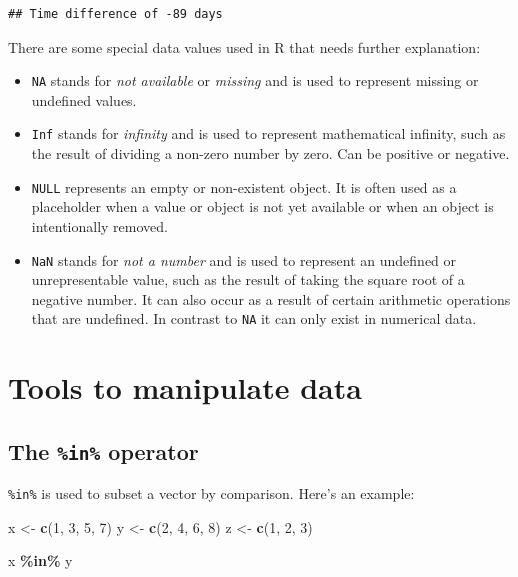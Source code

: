 \documentclass[
  12pt,
  oneside]{book}
\newenvironment{Shaded}{\begin{snugshade}}{\end{snugshade}}
\newcommand{\DecValTok}[1]{\textcolor[rgb]{0.00,0.00,0.81}{#1}}
\newcommand{\FunctionTok}[1]{\textcolor[rgb]{0.13,0.29,0.53}{\textbf{#1}}}
\newcommand{\NormalTok}[1]{#1}
\newcommand{\OtherTok}[1]{\textcolor[rgb]{0.56,0.35,0.01}{#1}}
\newcommand{\SpecialCharTok}[1]{\textcolor[rgb]{0.81,0.36,0.00}{\textbf{#1}}}
\providecommand{\tightlist}{%
  \setlength{\itemsep}{0pt}\setlength{\parskip}{0pt}}
\begin{document}
\begin{verbatim}
## Time difference of -89 days
\end{verbatim}

There are some special data values used in R that needs further explanation:

\begin{itemize}
\tightlist
\item
  \texttt{NA} stands for \emph{not available} or \emph{missing} and is used to represent missing or undefined values.
\item
  \texttt{Inf} stands for \emph{infinity} and is used to represent mathematical infinity, such as the result of dividing a non-zero number by zero. Can be positive or negative.\\
\item
  \texttt{NULL} represents an empty or non-existent object. It is often used as a placeholder when a value or object is not yet available or when an object is intentionally removed.
\item
  \texttt{NaN} stands for \emph{not a number} and is used to represent an undefined or unrepresentable value, such as the result of taking the square root of a negative number. It can also occur as a result of certain arithmetic operations that are undefined. In contrast to \texttt{NA} it can only exist in numerical data.
\end{itemize}

\hypertarget{tools-to-manipulate-data}{%
\section{Tools to manipulate data}\label{tools-to-manipulate-data}}

\hypertarget{the-in-operator}{%
\subsection{\texorpdfstring{The \texttt{\%in\%} operator}{The \%in\% operator}}\label{the-in-operator}}

\texttt{\%in\%} is used to subset a vector by comparison. Here's an example:

\begin{Shaded}
\begin{Highlighting}[]
\NormalTok{x }\OtherTok{\textless{}{-}} \FunctionTok{c}\NormalTok{(}\DecValTok{1}\NormalTok{, }\DecValTok{3}\NormalTok{, }\DecValTok{5}\NormalTok{, }\DecValTok{7}\NormalTok{)}
\NormalTok{y }\OtherTok{\textless{}{-}} \FunctionTok{c}\NormalTok{(}\DecValTok{2}\NormalTok{, }\DecValTok{4}\NormalTok{, }\DecValTok{6}\NormalTok{, }\DecValTok{8}\NormalTok{)}
\NormalTok{z }\OtherTok{\textless{}{-}} \FunctionTok{c}\NormalTok{(}\DecValTok{1}\NormalTok{, }\DecValTok{2}\NormalTok{, }\DecValTok{3}\NormalTok{)}

\NormalTok{x }\SpecialCharTok{\%in\%}\NormalTok{ y  }
\end{Highlighting}
\end{Shaded}
\end{document}
